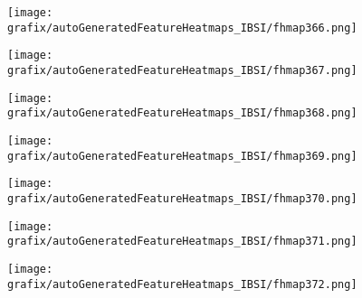 \begin{subfigure}{\wid\textwidth} 
    \centering 
    \caption{\tiny \sffamily {}} 
    \vspace{\vsp} 
    \texttt{[image: grafix/autoGeneratedFeatureHeatmaps\_IBSI/fhmap366.png]} 
\end{subfigure} 
\hspace{\hsp} 
\begin{subfigure}{\wid\textwidth} 
    \centering 
    \caption{\tiny \sffamily {}} 
    \vspace{\vsp} 
    \texttt{[image: grafix/autoGeneratedFeatureHeatmaps\_IBSI/fhmap367.png]} 
\end{subfigure} 
\hspace{\hsp} 
\begin{subfigure}{\wid\textwidth} 
    \centering 
    \caption{\tiny \sffamily {}} 
    \vspace{\vsp} 
    \texttt{[image: grafix/autoGeneratedFeatureHeatmaps\_IBSI/fhmap368.png]} 
\end{subfigure} 
\hspace{\hsp} 
\begin{subfigure}{\wid\textwidth} 
    \centering 
    \caption{\tiny \sffamily {}} 
    \vspace{\vsp} 
    \texttt{[image: grafix/autoGeneratedFeatureHeatmaps\_IBSI/fhmap369.png]} 
\end{subfigure} 
\hspace{\hsp} 
\begin{subfigure}{\wid\textwidth} 
    \centering 
    \caption{\tiny \sffamily {}} 
    \vspace{\vsp} 
    \texttt{[image: grafix/autoGeneratedFeatureHeatmaps\_IBSI/fhmap370.png]} 
\end{subfigure} 
\hspace{\hsp} 
\begin{subfigure}{\wid\textwidth} 
    \centering 
    \caption{\tiny \sffamily {}} 
    \vspace{\vsp} 
    \texttt{[image: grafix/autoGeneratedFeatureHeatmaps\_IBSI/fhmap371.png]} 
\end{subfigure} 
\hspace{\hsp} 
\begin{subfigure}{\wid\textwidth} 
    \centering 
    \caption{\tiny \sffamily {}} 
    \vspace{\vsp} 
    \texttt{[image: grafix/autoGeneratedFeatureHeatmaps\_IBSI/fhmap372.png]} 
\end{subfigure} 
